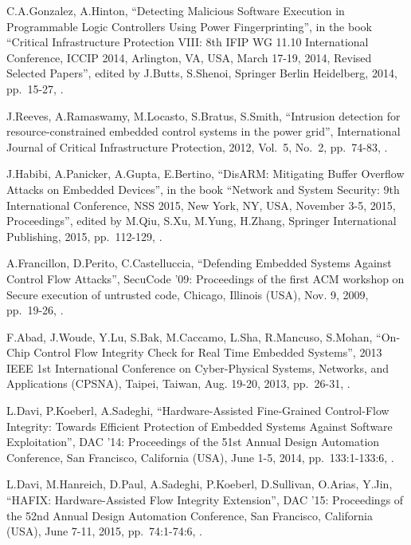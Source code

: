 \begin{thebibliography}{99}
C.A.Gonzalez, A.Hinton,
``Detecting Malicious Software Execution in Programmable Logic Controllers Using Power Fingerprinting'',
in the book ``Critical Infrastructure Protection VIII: 8th IFIP WG 11.10 International Conference, ICCIP 2014, Arlington, VA, USA, March 17-19, 2014, Revised Selected Papers'',
edited by J.Butts, S.Shenoi,
Springer Berlin Heidelberg, 2014,
pp.\ 15-27,
.

J.Reeves, A.Ramaswamy, M.Locasto, S.Bratus, S.Smith,
``Intrusion detection for resource-constrained embedded control systems in the power grid'',
International Journal of Critical Infrastructure Protection, 2012,
Vol.\ 5, No.\ 2,
pp.\ 74-83,
.

J.Habibi, A.Panicker, A.Gupta, E.Bertino,
``DisARM: Mitigating Buffer Overflow Attacks on Embedded Devices'',
in the book ``Network and System Security: 9th International Conference, NSS 2015, New York, NY, USA, November 3-5, 2015, Proceedings'',
edited by M.Qiu, S.Xu, M.Yung, H.Zhang,
Springer International Publishing, 2015,
pp.\ 112-129,
.

A.Francillon, D.Perito, C.Castelluccia,
``Defending Embedded Systems Against Control Flow Attacks'',
SecuCode '09: Proceedings of the first ACM workshop on Secure execution of untrusted code,
Chicago, Illinois (USA), Nov. 9, 2009,
pp.\ 19-26,
.

F.Abad, J.Woude, Y.Lu, S.Bak, M.Caccamo, L.Sha, R.Mancuso, S.Mohan,
``On-Chip Control Flow Integrity Check for Real Time Embedded Systems'',
2013 IEEE 1st International Conference on Cyber-Physical Systems, Networks, and Applications (CPSNA),
Taipei, Taiwan, Aug. 19-20, 2013,
pp.\ 26-31,
.

L.Davi, P.Koeberl, A.Sadeghi,
``Hardware-Assisted Fine-Grained Control-Flow Integrity: Towards Efficient Protection of Embedded Systems Against Software Exploitation'',
DAC '14: Proceedings of the 51st Annual Design Automation Conference,
San Francisco, California (USA), June 1-5, 2014,
pp.\ 133:1-133:6,
.

L.Davi, M.Hanreich, D.Paul, A.Sadeghi, P.Koeberl, D.Sullivan, O.Arias, Y.Jin,
``HAFIX: Hardware-Assisted Flow Integrity Extension'',
DAC '15: Proceedings of the 52nd Annual Design Automation Conference,
San Francisco, California (USA), June 7-11, 2015,
pp.\ 74:1-74:6,
.


\end{thebibliography}
